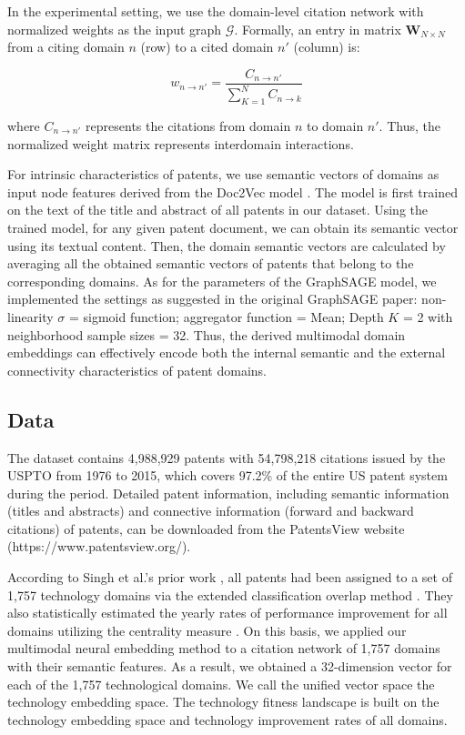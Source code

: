 \documentclass{article}
\begin{document}
In the experimental setting, we use the domain-level citation network with normalized weights as the input graph $\mathcal{G}$. Formally, an entry in matrix $\textbf{W}_{N \times N}$ from a citing domain $n$ (row) to a cited domain $n'$ (column) is: 

$$ w_{n\rightarrow n'}=\frac{C_{n\rightarrow n'}}{\sum^{N}_{K=1} C_{n\rightarrow k}}$$

where $C_{n\rightarrow n'}$ represents the citations from domain $n$ to domain $n'$. Thus, the normalized weight matrix represents interdomain interactions. 

For intrinsic characteristics of patents, we use semantic vectors of domains as input node features derived from the Doc2Vec model \cite{le2014distributed}. The model is first trained on the text of the title and abstract of all patents in our dataset. Using the trained model, for any given patent document, we can obtain its semantic vector using its textual content. Then, the domain semantic vectors are calculated by averaging all the obtained semantic vectors of patents that belong to the corresponding domains. As for the parameters of the GraphSAGE model, we implemented the settings as suggested in the original GraphSAGE paper: non-linearity $\sigma$ = sigmoid function; aggregator function = Mean; Depth $K$ = 2 with neighborhood sample sizes = 32. Thus, the derived multimodal domain embeddings can effectively encode both the internal semantic and the external connectivity characteristics of patent domains.

\subsection{Data}

The dataset contains 4,988,929 patents with 54,798,218 citations issued by the USPTO from 1976 to 2015, which covers 97.2\% of the entire US patent system during the period. Detailed patent information, including semantic information (titles and abstracts) and connective information (forward and backward citations) of patents, can be downloaded from the PatentsView website (https://www.patentsview.org/).

According to Singh et al.’s prior work \cite{singh2021technological}, all patents had been assigned to a set of 1,757 technology domains via the extended classification overlap method \cite{benson2015technology}. They also statistically estimated the yearly rates of performance improvement for all domains utilizing the centrality measure \cite{triulzi2020estimating}. On this basis, we applied our multimodal neural embedding method to a citation network of 1,757 domains with their semantic features. As a result, we obtained a 32-dimension vector for each of the 1,757 technological domains. We call the unified vector space the technology embedding space. The technology fitness landscape is built on the technology embedding space and technology improvement rates of all domains.
\end{document}
